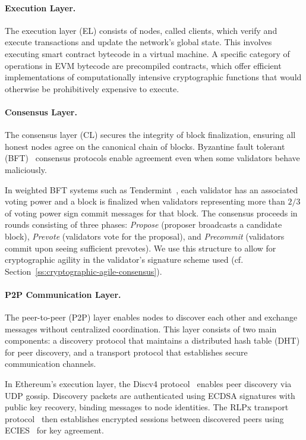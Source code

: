 \paragraph{Execution Layer.}
The execution layer (EL) consists of nodes, called clients, which verify and execute transactions and update the network's global state.
This involves executing smart contract bytecode in a virtual machine.
A specific category of operations in EVM bytecode are precompiled contracts, which offer efficient implementations of computationally intensive cryptographic functions that would otherwise be prohibitively expensive to execute.

\paragraph{Consensus Layer.}
The consensus layer (CL) secures the integrity of block finalization, ensuring all honest nodes agree on the canonical chain of blocks.
Byzantine fault tolerant (BFT)~\cite{ACM:LSP82,ARXIV:BKM18} consensus protocols enable agreement even when some validators behave maliciously.

In weighted BFT systems such as Tendermint~\cite{ARXIV:BKM18}, each validator has an associated voting power and a block is finalized when validators representing more than $2/3$ of voting power sign commit messages for that block.
The consensus proceeds in rounds consisting of three phases: \emph{Propose} (proposer broadcasts a candidate block), \emph{Prevote} (validators vote for the proposal), and \emph{Precommit} (validators commit upon seeing sufficient prevotes).
We use this structure to allow for cryptographic agility in the validator's signature scheme used (cf. Section~\ref{ss:cryptographic-agile-consensus}).

\paragraph{P2P Communication Layer.}
The peer-to-peer (P2P) layer enables nodes to discover each other and exchange messages without centralized coordination.
This layer consists of two main components: a discovery protocol that maintains a distributed hash table (DHT) for peer discovery, and a transport protocol that establishes secure communication channels.

In Ethereum's execution layer, the Discv4 protocol~\cite{ethereum_discv4} enables peer discovery via UDP gossip.
Discovery packets are authenticated using ECDSA signatures with public key recovery, binding messages to node identities.
The RLPx transport protocol~\cite{ethereum_rlpx} then establishes encrypted sessions between discovered peers using ECIES~\cite{JCSE:GHS10} for key agreement.
